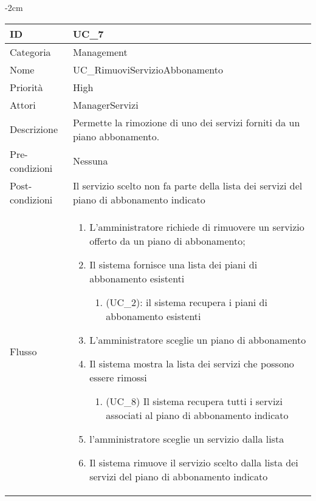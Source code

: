 \begin{center}
\begin{table}[bp]
    \centering
    \addtolength{\leftskip} {-2cm}
\begin{tabular}{ |p{2.6cm}|p{13cm}|  }
\hline
ID & UC\_7 \\\hline
Categoria & Management\\\hline
Nome & UC\_RimuoviServizioAbbonamento\\\hline
Priorità & High \\\hline
Attori &  ManagerServizi \\\hline
Descrizione & Permette la rimozione di uno dei servizi forniti da un piano abbonamento.\\\hline
Pre-condizioni &  Nessuna \\\hline
Post-condizioni &  Il servizio scelto non fa parte della lista dei servizi del piano di abbonamento indicato\\\hline
Flusso &  	\begin{enumerate}
		\item L'amministratore richiede di rimuovere un servizio offerto da un piano di abbonamento;
		\item Il sistema fornisce una lista dei piani di abbonamento esistenti
		\begin{enumerate}[  ]
			\item (UC\_2): il sistema recupera i piani di abbonamento esistenti
		\end{enumerate}
		\item L'amministratore sceglie un piano di abbonamento
		\item Il sistema mostra la lista dei servizi che possono essere rimossi		
			\begin{enumerate}[label*=\arabic*.]
			\item (UC\_8) Il sistema recupera tutti i servizi associati al piano di abbonamento indicato
			\end{enumerate}
		\item l'amministratore sceglie un servizio dalla lista
		\item Il sistema rimuove il servizio scelto dalla lista dei servizi del piano di abbonamento indicato
		\end{enumerate}\\\hline
\end{tabular}
\label{table_use_case:7}\newline
\end{table}


\end{center}
